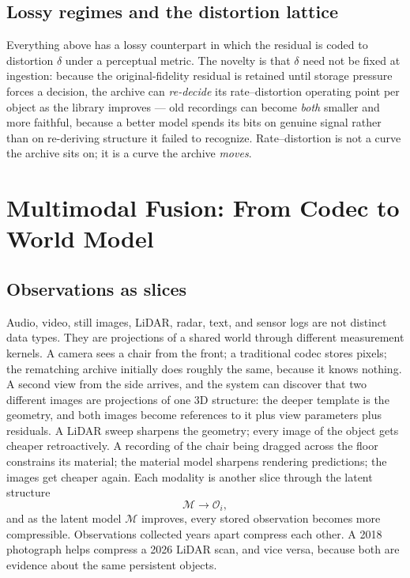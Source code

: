 \documentclass[11pt,oneside]{book}
\theoremstyle{remark}
\newcommand{\Obs}{\mathcal{O}}
\newcommand{\Mod}{\mathcal{M}}
\begin{document}
\section{Lossy regimes and the distortion lattice}

Everything above has a lossy counterpart in which the residual is coded
to distortion $\delta$ under a perceptual metric. The novelty is that
$\delta$ need not be fixed at ingestion: because the original-fidelity
residual is retained until storage pressure forces a decision, the
archive can \emph{re-decide} its rate--distortion operating point per
object as the library improves --- old recordings can become
\emph{both} smaller and more faithful, because a better model spends
its bits on genuine signal rather than on re-deriving structure it
failed to recognize. Rate--distortion is not a curve the archive sits
on; it is a curve the archive \emph{moves}.

\chapter{Multimodal Fusion: From Codec to World Model}

\section{Observations as slices}

Audio, video, still images, LiDAR, radar, text, and sensor logs are not
distinct data types. They are projections of a shared world through
different measurement kernels. A camera sees a chair from the front; a
traditional codec stores pixels; the rematching archive initially does
roughly the same, because it knows nothing. A second view from the side
arrives, and the system can discover that two different images are
projections of one 3D structure: the deeper template is the geometry,
and both images become references to it plus view parameters plus
residuals. A LiDAR sweep sharpens the geometry; every image of the
object gets cheaper retroactively. A recording of the chair being
dragged across the floor constrains its material; the material model
sharpens rendering predictions; the images get cheaper again. Each
modality is another slice through the latent structure
\[
\Mod \longrightarrow \Obs_i ,
\]
and as the latent model $\Mod$ improves, every stored observation
becomes more compressible. Observations collected years apart compress
each other. A 2018 photograph helps compress a 2026 LiDAR scan, and
vice versa, because both are evidence about the same persistent objects.
\end{document}
